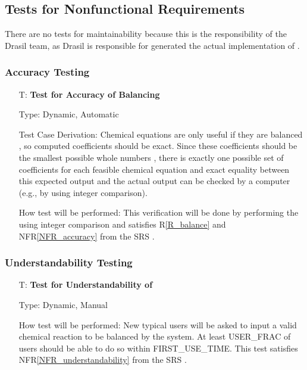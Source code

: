 \documentclass[12pt, titlepage]{article}
\newcounter{testnum} %
\newcommand{\rref}[1]{R\ref{#1}}
\newcommand{\nfrref}[1]{NFR\ref{#1}}
\begin{document}
\subsection{Tests for Nonfunctional Requirements}

There are no tests for maintainability because this is the responsibility of
the Drasil team, as Drasil is responsible for generated the actual
implementation of \progname{}.

\subsubsection{Accuracy Testing}

\begin{enumerate}

  \item[T\refstepcounter{testnum}\thetestnum \label{test_bal_accuracy}:]
    \textbf{Test for Accuracy of Balancing}

    Type: Dynamic, Automatic

    Test Case Derivation: Chemical equations are only useful if they are
    balanced \cite{lund_introduction_2023}, so computed coefficients should be
    exact. Since these coefficients should be the smallest possible whole
    numbers \cite{lund_introduction_2023}, there is exactly one possible set of
    coefficients for each feasible chemical equation and exact equality between
    this expected output and the actual output can be checked by a computer
    (e.g., by using integer comparison).

    How test will be performed: This verification will be done by performing
    the  using integer comparison and satisfies
    \rref{R_balance} and \nfrref{NFR_accuracy} from the SRS \cite{srs}.

\end{enumerate}

\newpage

\subsubsection{Understandability Testing}

\begin{enumerate}

  \item[T\refstepcounter{testnum}\thetestnum \label{test_understand}:]
    \textbf{Test for Understandability of \progname{}}

    Type: Dynamic, Manual

    How test will be performed: New typical users will be asked to input a
    valid chemical reaction to be balanced by the system. At least
    USER\_FRAC of users should be able to do so within
    FIRST\_USE\_TIME. This test satisfies \nfrref{NFR_understandability} from
    the SRS \cite{srs}.

\end{enumerate}
\end{document}
